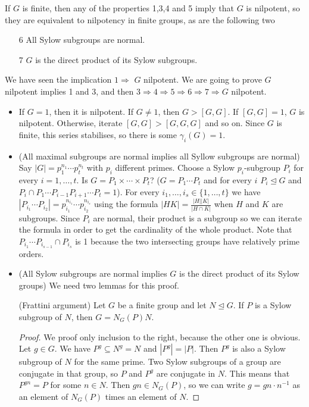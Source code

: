 \documentclass[twoside, 11pt]{article}
\begin{document}
\begin{teorema}
If $G$ is finite, then any of the properties 1,3,4 and 5 imply that $G$ is nilpotent, so they are equivalent to nilpotency in finite groups, as are the following two
\begin{enumerate}
\item[6] All Sylow subgroups are normal.
\item[7] $G$ is the direct product of its Sylow subgroups.
\end{enumerate}
\end{teorema}
\begin{dem}
We have seen the implication $1\Rightarrow$ $G$ nilpotent.  We are going to prove $G$ nilpotent implies  1 and 3, and then $3\Rightarrow 4\Rightarrow 5\Rightarrow 6\Rightarrow 7\Rightarrow G$ nilpotent.

\begin{itemize}
\item If $G=1$, then it is nilpotent. If $G\neq 1$, then $G>[G,G]$. If $[G,G]=1$, $G$ is nilpotent. Otherwise, iterate $[G,G]>[G,G,G]$ and so on. Since $G$ is finite, this series stabilises, so there is some $\gamma_i(G)=1$.

\item (All maximal subgroups are normal implies all Syllow subgroups are normal) Say $|G|=p_1^{n_1}\cdots p_t^{n_t}$ with $p_i$ different primes. Choose a Sylow $p_i$-subgroup $P_i$ for every $i=1,\dots, t$. Is $G=P_1\times\cdots\times P_t$? ($G=P_1\cdots P_t$ and for every $i$ $P_i\trianglelefteq G$ and $P_i\cap P_1\cdots P_{i-1}P_{i+1}\cdots P_t=1$). For every $i_1,\dots, i_s\in \{1,\dots, t\}$ we have $|P_{i_1}\cdots P_{i_2}|=p_{i_1}^{n_{i_1}}\cdots p_{i_2}^{n_{i_s}}$ using the formula $|HK|=\frac{|H||K|}{|H\cap K|}$ when $H$ and $K$ are subgroups. Since $P_i$ are normal, their product is a subgroup so we can iterate the formula in order to get the cardinality of the whole product. Note that $P_{i_1}\cdots P_{i_{s-1}}\cap P_{i_s}$ is 1 because the two intersecting groups have relatively prime orders.  

\item (All Sylow subgroups are normal implies $G$ is the direct product of its Sylow groups) We need two lemmas for this proof.
\begin{lemma}(Frattini argument)
Let $G$ be a finite group and let $N\trianglelefteq G$. If $P$ is a Sylow subgroup of $N$, then $G=N_G(P)N$. 
\end{lemma}
\begin{proof}
We proof only inclusion to the right, because the other one is obvious. Let $g\in G$. We have $P^g\subseteq N^g=N$ and $|P^g|=|P|$. Then $P^g$ is also a Sylow subgroup of $N$ for the same prime. Two Sylow subgroups of a group are conjugate in that group, so $P$ and $P^g$ are conjugate in $N$. This means that $P^{gn}=P$ for some $n\in N$. Then $gn\in N_G(P)$, so we can write $g=gn\cdot n^{-1}$ as an element of $N_G(P)$ times an element of $N$. 
\end{proof}


\end{itemize}
\end{dem}
\end{document}
